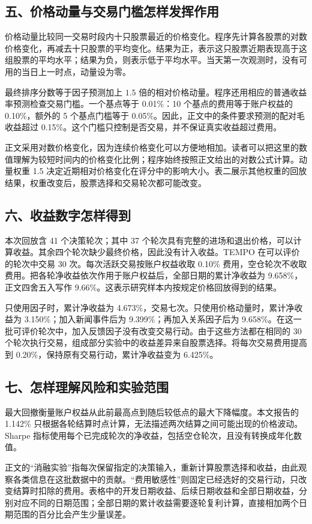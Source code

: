 \documentclass[conference]{IEEEtran}
\begin{document}
\subsection*{五、价格动量与交易门槛怎样发挥作用}
价格动量比较同一交易时段内十只股票最近的价格变化。程序先计算各股票的对数价格变化，再减去十只股票的平均变化。结果为正，表示这只股票近期表现高于这组股票的平均水平；结果为负，则表示低于平均水平。当天第一次观测时，没有可用的当日上一时点，动量设为零。

最终排序分数等于因子预测加上 $1.5$ 倍的相对价格动量。程序还用相应的普通收益率预测检查交易门槛。一个基点等于 0.01\%：10 个基点的费用等于账户权益的 0.10\%，额外的 5 个基点门槛等于 0.05\%。因此，正文中的条件要求预测的配对毛收益超过 0.15\%。这个门槛只控制是否交易，并不保证真实收益超过费用。

正文采用对数价格变化，因为连续价格变化可以方便地相加。读者可以把这里的数值理解为较短时间内的价格变化比例；程序始终按照正文给出的对数公式计算。动量权重 1.5 决定近期相对价格变化在评分中的影响大小。表二展示其他权重的回放结果，权重改变后，股票选择和交易轮次都可能改变。

\subsection*{六、收益数字怎样得到}
本次回放含 41 个决策轮次；其中 37 个轮次具有完整的进场和退出价格，可以计算收益。其余四个轮次缺少最终价格，因此没有计入收益。TEMPO 在可以评价的轮次中交易 30 次。每次活跃交易按账户权益收取 0.10\% 费用，空仓轮次不收取费用。把各轮净收益依次作用于账户权益后，全部日期的累计净收益为 9.658\%，正文四舍五入写作 9.66\%。这表示研究样本内按规定价格回放得到的结果。

只使用因子时，累计净收益为 4.673\%，交易七次。只使用价格动量时，累计净收益为 3.150\%；加入新闻事件后为 9.399\%；再加入关系因子后为 9.658\%。在这一批可评价轮次中，加入反馈因子没有改变交易行动。由于这些方法都在相同的 30 个轮次执行交易，组成部分实验中的收益差异来自股票选择。将每次交易费用提高到 0.20\%，保持原有交易行动，累计净收益变为 6.425\%。

\subsection*{七、怎样理解风险和实验范围}
最大回撤衡量账户权益从此前最高点到随后较低点的最大下降幅度。本文报告的 1.142\% 只根据各轮结算时点计算，无法描述两次结算之间可能出现的价格波动。Sharpe 指标使用每个已完成轮次的净收益，包括空仓轮次，且没有转换成年化数值。

正文的“消融实验”指每次保留指定的决策输入，重新计算股票选择和收益，由此观察各类信息在这批数据中的贡献。“费用敏感性”则固定已经选好的交易行动，只改变结算时扣除的费用。表格中的开发日期收益、后续日期收益和全部日期收益，分别对应不同的日期范围；全部日期的累计收益需要逐轮复利计算，直接相加两个日期范围的百分比会产生少量误差。
\end{document}
